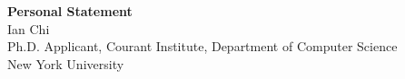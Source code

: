 \documentclass[11pt]{article}
\begin{document}
\begin{center}
    {\Large \textbf{Personal Statement}}\\[4pt]
    {\large Ian Chi}\\[2pt]
    Ph.D. Applicant, Courant Institute, Department of Computer Science\\
    New York University
\end{center}

\vspace{1em}

\end{document}
